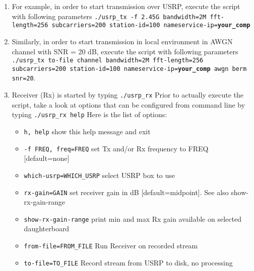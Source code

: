 \begin{enumerate}
	\item For example, in order to start transmission over USRP, execute the script with following parameters \newline \texttt{./usrp\_tx -f 2.45G \option bandwidth=2M \option fft-length=256 \option subcarriers=200 \newline
	\option station-id=100 \option nameservice-ip=\textbf{your\_comp}}
	\item Similarly, in order to start transmission in local environment in AWGN channel with SNR = 20 dB, execute the script with following parameters 
	\newline \texttt{./usrp\_tx \option to-file channel \option bandwidth=2M \option fft-length=256 \option subcarriers=200\newline 
	\option station-id=100 \option nameservice-ip=\textbf{your\_comp} \option awgn \option berm \option snr=20}.
	\item Receiver (Rx) is started by typing\newline
	\texttt{./usrp\_rx}\newline
	Prior to actually execute the script, take a look at options that can be configured from command line by typing\newline
	\texttt{./usrp\_rx \option help}\newline 
	Here is the list of options:
  \begin{itemize}
 		\item \texttt{h, \option help}            show this help message and exit
 		\item \texttt{-f FREQ, \option freq=FREQ}  set Tx and/or Rx frequency to FREQ [default=none]
		\item  \texttt{\option which-usrp=WHICH\_USRP} select USRP box to use
		\item  \texttt{\option rx-gain=GAIN}        set receiver gain in dB [default=midpoint].  See also \option show-rx-gain-range
		\item  \texttt{\option show-rx-gain-range}  print min and max Rx gain available on selected daughterboard
  		\item  \texttt{\option from-file=FROM\_FILE} Run Receiver on recorded stream
  		\item  \texttt{\option to-file=TO\_FILE}     Record stream from USRP to disk, no processing

\end{itemize}
\end{enumerate}
